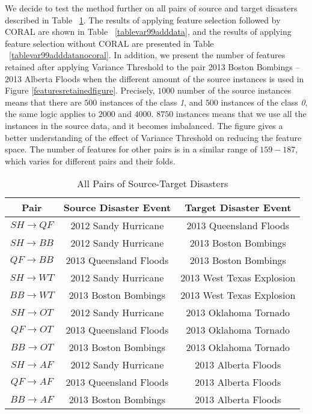 We decide to test the method further on all pairs of source and target disasters described in Table ~\ref{tableadddata}. The results of applying feature selection followed by CORAL are shown in Table ~\ref{tablevar99adddata}, and the results of applying feature selection without CORAL are presented in Table ~\ref{tablevar99adddatanocoral}. In addition, we present the number of features retained after applying Variance Threshold to the pair 2013 Boston Bombings -- 2013 Alberta Floods when the different amount of the source instances is used in Figure \ref{featuresretainedfigure}. Precisely, $1000$ number of the source instances means that there are $500$ instances of the class \textit{1}, and $500$ instances of the class \textit{0}, the same logic applies to $2000$ and $4000$. $8750$ instances means that we use all the instances in the source data, and it becomes imbalanced. The figure gives a better understanding of the effect of Variance Threshold on reducing the feature space. The number of features for other pairs is in a similar range of $159-187$, which varies for different pairs and their folds.

\begin{table}[ht]
    \begin{center}
    \caption{All Pairs of Source-Target Disasters}
    \begin{tabular}[c]{|c|c|c|}
        \hline
        Pair & Source Disaster Event & Target Disaster Event  \\
        \hline
        $SH \rightarrow QF$ & 2012 Sandy Hurricane & 2013 Queensland Floods \\

        $SH \rightarrow BB$ & 2012 Sandy Hurricane & 2013 Boston Bombings \\
        $QF \rightarrow BB$ & 2013 Queensland Floods & 2013 Boston Bombings \\

        $SH \rightarrow WT$ & 2012 Sandy Hurricane & 2013 West Texas Explosion \\
        $BB \rightarrow WT$ & 2013 Boston Bombings & 2013 West Texas Explosion \\

        $SH \rightarrow OT$ & 2012 Sandy Hurricane & 2013 Oklahoma Tornado \\
        $QF \rightarrow OT$ & 2013 Queensland Floods & 2013 Oklahoma Tornado \\
        $BB \rightarrow OT$ & 2013 Boston Bombings & 2013 Oklahoma Tornado  \\

        $SH \rightarrow AF$ & 2012 Sandy Hurricane & 2013 Alberta Floods \\
        $QF \rightarrow AF$ & 2013 Queensland Floods & 2013 Alberta Floods \\
        $BB \rightarrow AF$ & 2013 Boston Bombings & 2013 Alberta Floods \\
        \hline
    \end{tabular}
    \label{tableadddata}
   \end{center}
\end{table}



